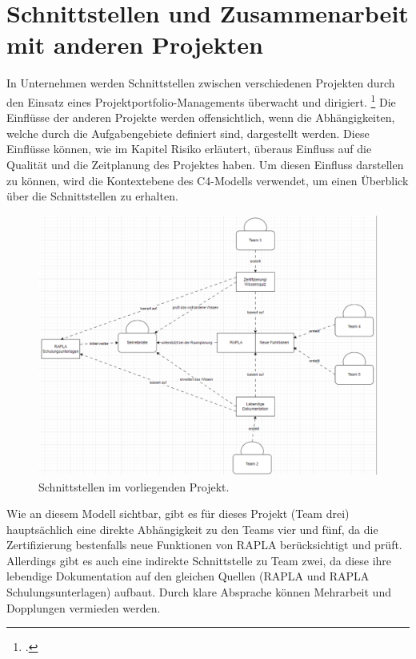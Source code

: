 \chapter{Schnittstellen und Zusammenarbeit mit anderen Projekten}
In Unternehmen werden Schnittstellen zwischen verschiedenen Projekten durch den Einsatz eines Projektportfolio-Managements überwacht und dirigiert.
\footcite[Vgl.][S. 356 f.]{bilginHandlingProjectDependencies2017}
Die Einflüsse der anderen Projekte werden offensichtlich, wenn die Abhängigkeiten, welche durch die Aufgabengebiete definiert sind,
dargestellt werden. Diese Einflüsse können, wie im Kapitel Risiko erläutert, überaus Einfluss auf die Qualität und die Zeitplanung des Projektes haben.
Um diesen Einfluss darstellen zu können, wird die Kontextebene des C4-Modells verwendet, um einen Überblick über die Schnittstellen zu erhalten.
\begin{figure}[H]
    \centering
    \includegraphics[width=1\linewidth]{graphics/rapla_model.png}
    \caption{Schnittstellen im vorliegenden Projekt.}\label{abb:zeitplanung}
\end{figure}
Wie an diesem Modell sichtbar, gibt es für dieses Projekt (Team drei) 
hauptsächlich eine direkte Abhängigkeit zu den Teams vier und fünf, da die
Zertifizierung bestenfalls neue Funktionen von \ac{RAPLA} berücksichtigt und prüft. Allerdings
gibt es auch eine indirekte Schnittstelle zu Team zwei, da diese ihre lebendige Dokumentation
auf den gleichen Quellen (\ac{RAPLA} und \ac{RAPLA} Schulungsunterlagen) aufbaut. Durch klare Absprache
können Mehrarbeit und Dopplungen vermieden werden.

